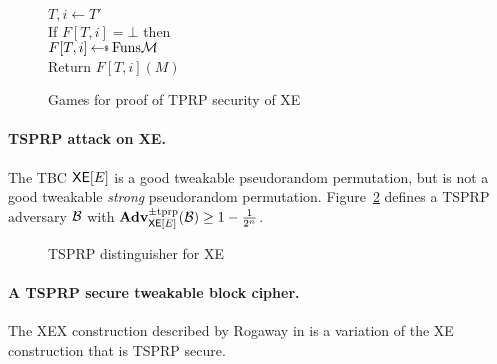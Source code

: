 \begin{figure}[t]
{    \\
    $T,i\gets T'$\\
    If $F[T,i] = \bot$ then\\
    \ind $F[T, i]\getsr\Funs{\msgspace}$\\
    Return $F[T, i](M)$
  }
  \caption{Games for proof of TPRP security of XE}
  \label{fig:xe-tprp-games}
  \end{figure}



\paragraph{TSPRP attack on XE.} The TBC $\mathsf{XE}[E]$ is a good tweakable pseudorandom permutation, but is not a good tweakable \emph{strong} pseudorandom permutation. Figure~\ref{fig:xe-tsprp-dist} defines a TSPRP adversary ${\mathcal B}$ with $\mathbf{Adv}^{\mathrm{\pm tprp}}_{\mathsf{XE}[E]}({\mathcal B}) \geq 1-\frac{1}{2^n}$.

\begin{figure}[h]
\centering
{}
\caption{TSPRP distinguisher for XE}
\label{fig:xe-tsprp-dist}
\end{figure}
\iffalse
\begin{align*}
  M_0 &= D_K(C_0) \oplus E_K(0)\;\; (=\xedec(K, (0, 0), C))\\
  M_1 &= D_K(C_0) \oplus E_K(1)\;\; (=\xedec(K, (1, 0), C))\\
  M_0 \oplus M_1 &= E_K(0) \oplus E_K(1)\\
  \xeenc(K, (1, 0), 0) &= E_K(E_K(1))\\
  \xeenc(K, (0, 0), M_0 \oplus M_1) &= E_K(E_K(0) \oplus M_0 \oplus M_1) = E_K(E_K(0) \oplus E_K(0) \oplus E_K(1)) = E_K(E_K(1))
\end{align*}
\fi

\paragraph{A TSPRP secure tweakable block cipher.} The XEX construction described by Rogaway in \cite{rogaway2004efficient} is a variation of the XE construction that is TSPRP secure. 

